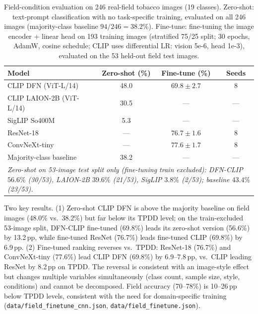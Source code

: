 \documentclass[10pt,a4paper]{article}
\begin{document}
\begin{table}[!ht]
\centering
\caption{Field-condition evaluation on 246 real-field tobacco images (19 classes). Zero-shot: text-prompt classification with no task-specific training, evaluated on all 246 images (majority-class baseline $94/246 = 38.2\%$). Fine-tune: fine-tuning the image encoder + linear head on 193 training images (stratified 75/25 split; 30 epochs, AdamW, cosine schedule; CLIP uses differential LR: vision 5e-6, head 1e-3), evaluated on the 53 held-out field test images.}
\label{tab:field}
\setlength{\tabcolsep}{6pt}
\begin{tabular}{lccc}
\toprule
\textbf{Model} & \textbf{Zero-shot (\%)} & \textbf{Fine-tune (\%)} & \textbf{Seeds} \\
\midrule
CLIP DFN (ViT-L/14) & 48.0 & $69.8\pm2.7$ & 8 \\
CLIP LAION-2B (ViT-L/14) & 30.5 & --- & --- \\
SigLIP So400M & 5.3 & --- & --- \\
\midrule
ResNet-18 & --- & $76.7\pm1.6$ & 8 \\
ConvNeXt-tiny & --- & $77.6\pm1.7$ & 8 \\
\midrule
Majority-class baseline & 38.2 & --- & --- \\
\midrule
\multicolumn{4}{p{\dimexpr\hsize-2\tabcolsep\relax}}{\small\emph{Zero-shot on 53-image test split only (fine-tuning train excluded): DFN-CLIP $56.6\%$ (30/53), LAION-2B $39.6\%$ (21/53), SigLIP $3.8\%$ (2/53); baseline $43.4\%$ (23/53).}} \\
\bottomrule
\end{tabular}
\end{table}

Two key results. (1) Zero-shot CLIP DFN is above the majority baseline on field images (48.0\% vs.\ 38.2\%) but far below its TPDD level; on the train-excluded 53-image split, DFN-CLIP fine-tuned (69.8\%) leads its zero-shot version (56.6\%) by 13.2\,pp, while fine-tuned ResNet (76.7\%) leads fine-tuned CLIP (69.8\%) by 6.9\,pp. (2) Fine-tuned ranking reverses vs.\ TPDD: ResNet-18 (76.7\%) and ConvNeXt-tiny (77.6\%) lead CLIP DFN (69.8\%) by 6.9--7.8\,pp, vs.\ CLIP leading ResNet by 8.2\,pp on TPDD. The reversal is consistent with an image-style effect but changes multiple variables simultaneously (class count, sample size, style, conditions) and cannot be decomposed. Field accuracy (70--78\%) is 10--26\,pp below TPDD levels, consistent with the need for domain-specific training (\texttt{data/field\_finetune\_cnn.json}, \texttt{data/field\_finetune.json}).
\end{document}
